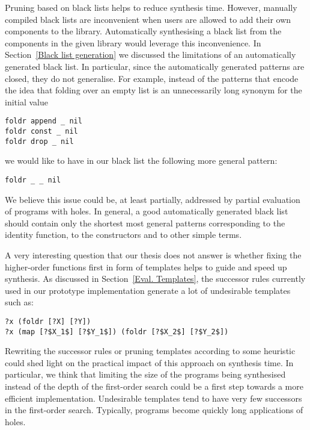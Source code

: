 Pruning based on black lists helps to reduce synthesis time. However, manually compiled black lists are inconvenient when users are allowed to add their own components to the library. Automatically synthesising a black list from the components in the given library would leverage this inconvenience. In Section~\ref{Black list generation} we discussed the limitations of an automatically generated black list. In particular, since the automatically generated patterns are closed, they do not generalise. For example, instead of the patterns that encode the idea that folding over an empty list is an unnecessarily long synonym for the initial value
\begin{lstlisting}[style=plain]
foldr append _ nil
foldr const _ nil
foldr drop _ nil
\end{lstlisting}
we would like to have in our black list the following more general pattern:
\begin{lstlisting}[style=plain]
foldr _ _ nil
\end{lstlisting}
We believe this issue could be, at least partially, addressed by partial evaluation of programs with holes. In general, a good automatically generated black list should contain only the shortest most general patterns corresponding to the identity function, to the constructors and to other simple terms.


A very interesting question that our thesis does not answer is whether fixing the higher-order functions first in form of templates helps to guide and speed up synthesis. As discussed in Section~\ref{Eval. Templates}, the successor rules currently used in our prototype implementation generate a lot of undesirable templates such as:
\begin{lstlisting}[style=plain]
?x (foldr [?X] [?Y])
?x (map [?$X_1$] [?$Y_1$]) (foldr [?$X_2$] [?$Y_2$])
\end{lstlisting}
Rewriting the successor rules or pruning templates according to some heuristic could shed light on the practical impact of this approach on synthesis time. In particular, we think that limiting the size of the programs being synthesised instead of the depth of the first-order search could be a first step towards a more efficient implementation. Undesirable templates tend to have very few successors in the first-order search. Typically, programs become quickly long applications of holes.


